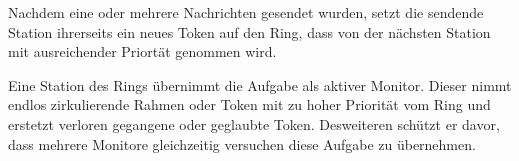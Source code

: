 Nachdem eine oder mehrere Nachrichten gesendet wurden, setzt die sendende
Station ihrerseits ein neues Token auf den Ring, dass von der nächsten Station
mit ausreichender Priortät genommen wird.

Eine Station des Rings übernimmt die Aufgabe als aktiver Monitor. Dieser nimmt
endlos zirkulierende Rahmen oder Token mit zu hoher Priorität vom Ring und
erstetzt verloren gegangene oder geglaubte Token. Desweiteren schützt er davor,
dass mehrere Monitore gleichzeitig versuchen diese Aufgabe zu übernehmen.
